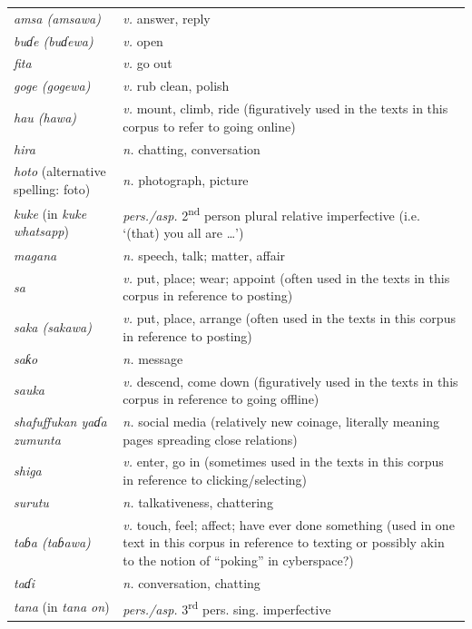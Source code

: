 \documentclass[output=paper
,newtxmath
,modfonts
,nonflat]{langsci/langscibook}
\begin{document}
\noindent
\begin{tabularx}{\textwidth}{p{3cm}Q}
\textit{amsa (amsawa)} & \textit{v.} answer, reply \\
\textit{buɗe (buɗewa)} & \textit{v.} open \\
\textit{fita} & \textit{v.} go out\\
\textit{goge (gogewa)} & \textit{v.} rub clean, polish\\
\textit{hau (hawa)} & \textit{v.} mount, climb, ride (figuratively used in the texts in this corpus to refer to going online) \\
\textit{hira} & \textit{n.} chatting, conversation\\
\textit{hoto} (alternative spelling: foto) & \textit{n.} photograph, picture\\
\textit{kuke} (in \textit{kuke whatsapp}) & \textit{pers./asp.} 2\textsuperscript{nd} person plural relative imperfective (i.e. ‘(that) you all are …’)\\
\textit{magana} & \textit{n.} speech, talk; matter, affair\\
\textit{sa} & \textit{v.} put, place; wear; appoint (often used in the texts in this corpus in reference to posting)\\
\textit{saka (sakawa)} & \textit{v.} put, place, arrange (often used in the texts in this corpus in reference to posting)\\
\textit{saƙo} & \textit{n.} message\\
\textit{sauka} & \textit{v.} descend, come down (figuratively used in the texts in this corpus in reference to going offline)\\
\textit{shafuffukan yaɗa zumunta} & \textit{n.} social media (relatively new coinage, literally meaning pages spreading close relations)\\
\textit{shiga} & \textit{v.} enter, go in (sometimes used in the texts in this corpus in reference to clicking/selecting)\\
\textit{surutu} & \textit{n.} talkativeness, chattering\\
\textit{taɓa (taɓawa)} & \textit{v.} touch, feel; affect; have ever done something (used in one text in this corpus in reference to texting or possibly akin to the notion of “poking” in cyberspace?) \\
\textit{taɗi} & \textit{n.} conversation, chatting\\
\textit{tana} (in \textit{tana on}) & \textit{pers./asp.} 3\textsuperscript{rd} pers. sing.  imperfective\\

\end{tabularx}
\end{document}
